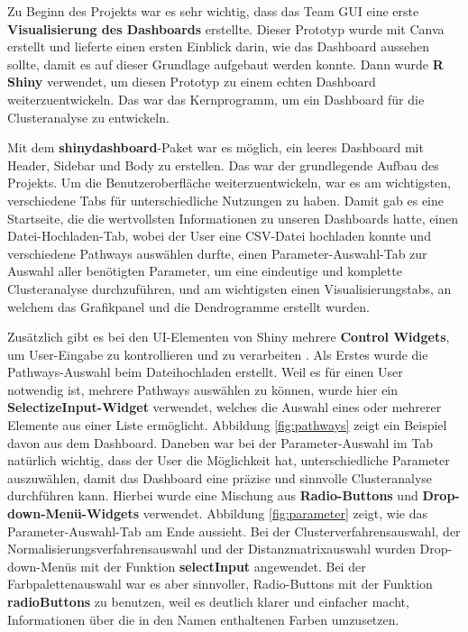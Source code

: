 \documentclass[12pt]{article}
\begin{document}
Zu Beginn des Projekts war es sehr wichtig, dass das Team GUI eine erste \textbf{Visualisierung des Dashboards} erstellte. Dieser Prototyp wurde mit Canva erstellt und lieferte einen ersten Einblick darin, wie das Dashboard aussehen sollte, damit es auf dieser Grundlage aufgebaut werden konnte. Dann wurde \textbf{R Shiny} verwendet, um diesen Prototyp zu einem echten Dashboard weiterzuentwickeln. Das war das Kernprogramm, um ein Dashboard für die Clusteranalyse zu entwickeln.

Mit dem \textbf{shinydashboard}-Paket war es möglich, ein leeres Dashboard mit Header, Sidebar und Body zu erstellen. Das war der grundlegende Aufbau des Projekts. Um die Benutzeroberfläche weiterzuentwickeln, war es am wichtigsten, verschiedene Tabs für unterschiedliche Nutzungen zu haben. Damit gab es eine Startseite, die die wertvollsten Informationen zu unseren Dashboards hatte, einen Datei-Hochladen-Tab, wobei der User eine CSV-Datei hochladen konnte und verschiedene Pathways auswählen durfte, einen Parameter-Auswahl-Tab zur Auswahl aller benötigten Parameter, um eine eindeutige und komplette Clusteranalyse durchzuführen, und am wichtigsten einen Visualisierungstabs, an welchem das Grafikpanel und die Dendrogramme erstellt wurden. 

Zusätzlich gibt es bei den UI-Elementen von Shiny mehrere \textbf{Control Widgets}, um User-Eingabe zu kontrollieren und zu verarbeiten \cite{ControlWidgets}. Als Erstes wurde die Pathways-Auswahl beim Dateihochladen erstellt. Weil es für einen User notwendig ist, mehrere Pathways auswählen zu können, wurde hier ein \textbf{SelectizeInput-Widget} verwendet, welches die Auswahl eines oder mehrerer Elemente aus einer Liste ermöglicht. Abbildung \ref{fig:pathways} zeigt ein Beispiel davon aus dem Dashboard. Daneben war bei der Parameter-Auswahl im Tab natürlich wichtig, dass der User die Möglichkeit hat, unterschiedliche Parameter auszuwählen, damit das Dashboard eine präzise und sinnvolle Clusteranalyse durchführen kann. Hierbei wurde eine Mischung aus \textbf{Radio-Buttons} und \textbf{Drop-down-Menü-Widgets} verwendet. Abbildung \ref{fig:parameter} zeigt, wie das Parameter-Auswahl-Tab am Ende aussieht. Bei der Clusterverfahrensauswahl, der Normalisierungsverfahrensauswahl und der Distanzmatrixauswahl wurden Drop-down-Menüs mit der Funktion \textbf{selectInput} angewendet. Bei der Farbpalettenauswahl war es aber sinnvoller, Radio-Buttons mit der Funktion \textbf{radioButtons} zu benutzen, weil es deutlich klarer und einfacher macht, Informationen über die in den Namen enthaltenen Farben umzusetzen.
\end{document}

